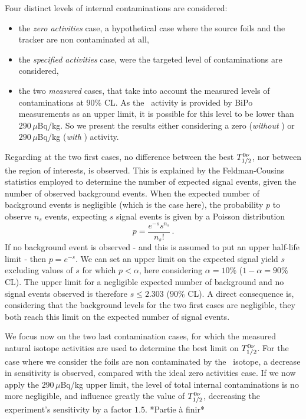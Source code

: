 Four distinct levels of internal contaminations are considered:
\begin{itemize}
\item the \emph{zero activities} case, a hypothetical case where the source foils and the tracker are non contaminated at all,
\item the \emph{specified activities} case, were the targeted level of contaminations are considered,
\item the two \emph{measured} cases, that take into account the measured levels of contaminations at $90\%$ CL.
  As the \Bi\ activity is provided by BiPo measurements as an upper limit, it is possible for this level to be lower than $290\,\mu$Bq/kg.
  So we present the results either considering a zero (\emph{without \Bi}) or $290\,\mu$Bq/kg (\emph{with \Bi}) activity.
\end{itemize}
Regarding at the two first cases, no difference between the best $T_{1/2}^{0\nu}$, nor between the region of interests, is observed.
This is explained by the Feldman-Cousins statistics employed to determine the number of expected signal events, given the number of observed background events.
When the expected number of background events is negligible (which is the case here), the probability $p$ to observe $n_{s}$ events, expecting $s$ signal events is given by a Poisson distribution
\begin{equation}
p = \frac{e^{-s}s^{n_{s}}}{n_{s}!}\,.
\end{equation}
If no background event is observed - and this is assumed to put an upper half-life limit - then $p = e^{-s}$.
We can set an upper limit on the expected signal yield $s$ excluding values of $s$ for which $p < \alpha$, here considering $\alpha = 10\%$ ($1-\alpha = 90\%$ CL).
The upper limit for a negligible expected number of background and no signal events observed is therefore $s \leq 2.303$ ($90\%$ CL).
A direct consequence is, considering that the background levels for the two first cases are negligible, they both reach this limit on the expected number of signal events.

We focus now on the two last contamination cases, for which the measured natural isotope activities are used to determine the best limit on $T_{1/2}^{0\nu}$.
For the case where we consider the foils are non contaminated by the \Bi\ isotope, a decrease in sensitivity is observed, compared with the ideal zero activities case.
If we now apply the $290\,\mu$Bq/kg upper limit, the level of total internal contaminations is no more negligible, and influence greatly the value of $T_{1/2}^{0\nu}$, decreasing the experiment's sensitivity by a factor $1.5$.
*Partie à finir*

